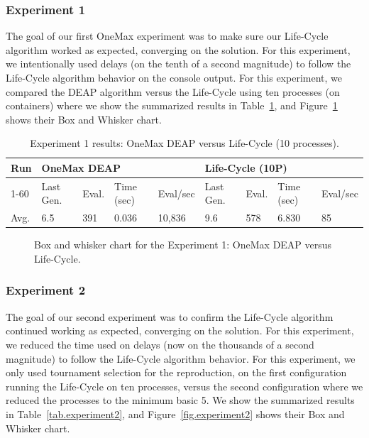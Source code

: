 \documentclass[graybox]{svmult}
\begin{document}
\subsubsection{Experiment 1} The goal of our first OneMax experiment was to
make sure our Life-Cycle algorithm worked as expected, converging on the
solution. For this experiment, we intentionally used delays (on the tenth of a
second magnitude) to follow the Life-Cycle algorithm behavior on the console
output. For this experiment, we compared the DEAP algorithm versus the
Life-Cycle using ten processes (on containers) where we show the summarized
results in Table~\ref{tab.experiment1}, and Figure~\ref{fig.experiment1} shows
their Box and Whisker chart.

\begin{table}[]
    \centering        
    \caption{Experiment 1 results: OneMax DEAP versus Life-Cycle (10 processes).}\label{tab.experiment1}
    \begin{tabular}{|l|l|l|l|l|l|l|l|l|}
    \hline
    Run & \multicolumn{4}{l|}{OneMax DEAP} & \multicolumn{4}{l|}{Life-Cycle (10P)} \\ \hline
    1-60 & Last Gen. & Eval. & Time (sec) & Eval/sec & Last Gen. & Eval. & Time (sec) & Eval/sec \\ \hline
    Avg. & 6.5 & 391 & 0.036 & 10,836 & 9.6 & 578 & 6.830 & 85 \\ \hline
    \end{tabular}
    \end{table}

\begin{figure}
    \caption{Box and whisker chart for the Experiment 1: OneMax DEAP versus Life-Cycle.} \label{fig.experiment1}
  \end{figure}


\subsubsection{Experiment 2} The goal of our second experiment was to confirm
the Life-Cycle algorithm continued working as expected, converging on the
solution. For this experiment, we reduced the time used on delays (now on the
thousands of a second magnitude) to follow the Life-Cycle algorithm behavior.
For this experiment, we only used tournament selection for the reproduction, on
the first configuration running the Life-Cycle on ten processes, versus the
second configuration where we reduced the processes to the minimum basic 5. We
show the summarized results in Table~\ref{tab.experiment2}, and
Figure~\ref{fig.experiment2} shows their Box and Whisker chart.
\end{document}
